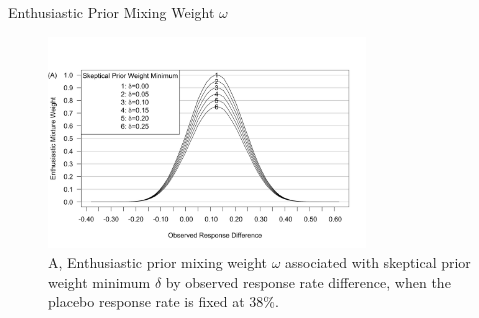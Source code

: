 \documentclass{beamer}
\begin{document}
\begin{frame}{Enthusiastic Prior Mixing Weight $\omega$}

\vspace{-0.5cm}
\begin{figure}[htbp]
\begin{center}
\includegraphics[width=0.75\textwidth]{./figures/3-part-compatibility-2.png}
    \caption{A, Enthusiastic prior mixing weight $\omega$ associated with skeptical prior weight minimum $\delta$ by observed response rate difference, when the placebo response rate is fixed at $38\%$.}
\label{fig:ex2varyomega}
 \end{center}
\end{figure}
\end{frame}

\end{document}
